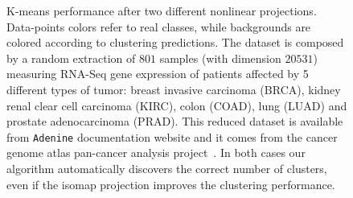 \documentclass[twoside,11pt]{article}
\makeatletter
\newcommand{\ade}{\texttt{Adenine}\@\xspace}
\makeatother
\begin{document}
\begin{figure}[h!] 
    \centering
    \hfill%
\caption{K-means performance after two different nonlinear projections. Data-points colors refer to real classes, while backgrounds are colored according to clustering predictions. The dataset is composed by a random extraction of $801$ samples (with dimension $20531$) measuring RNA-Seq gene expression of patients affected by 5 different types of tumor: breast invasive carcinoma (BRCA), kidney renal clear cell carcinoma (KIRC), colon  (COAD), lung  (LUAD) and prostate adenocarcinoma (PRAD). This reduced dataset is available from \ade documentation website and it comes from the cancer genome atlas pan-cancer analysis project~\citep{weinstein2013cancer}. In both cases our algorithm automatically discovers the correct number of clusters, even if the isomap projection improves the clustering performance.} \label{fig:scatter}
\end{figure}




\end{document}
